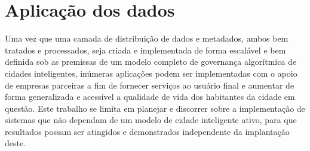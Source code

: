 \section{Aplicação dos dados}

Uma vez que uma camada de distribuição de dados e metadados, ambos bem tratados e processados, seja criada e implementada de forma escalável e bem definida sob as premissas de um modelo completo de governança algorítmica de cidades inteligentes, inúmeras aplicações podem ser implementadas com o apoio de empresas parceiras a fim de fornecer serviços ao usuário final e aumentar de forma generalizada e acessível a qualidade de vida dos habitantes da cidade em questão. Este trabalho se limita em planejar e discorrer sobre a implementação de sistemas que não dependam de um modelo de cidade inteligente ativo, para que resultados possam ser atingidos e demonstrados independente da implantação deste.